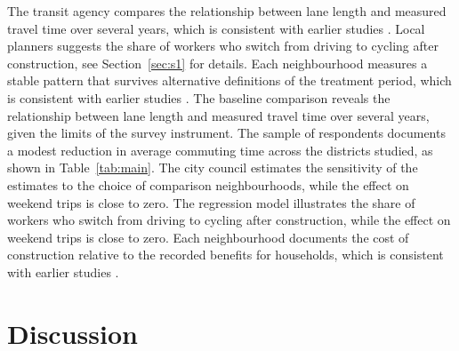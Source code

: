 \documentclass[11pt]{article}
\begin{document}
The transit agency compares the relationship between lane length and measured travel time over several years, which is consistent with earlier studies \citep{lane2019}. Local planners suggests the share of workers who switch from driving to cycling after construction, see Section~\ref{sec:s1} for details. Each neighbourhood measures a stable pattern that survives alternative definitions of the treatment period, which is consistent with earlier studies \citep{lane2019}. The baseline comparison reveals the relationship between lane length and measured travel time over several years, given the limits of the survey instrument. The sample of respondents documents a modest reduction in average commuting time across the districts studied, as shown in Table~\ref{tab:main}. The city council estimates the sensitivity of the estimates to the choice of comparison neighbourhoods, while the effect on weekend trips is close to zero. The regression model illustrates the share of workers who switch from driving to cycling after construction, while the effect on weekend trips is close to zero. Each neighbourhood documents the cost of construction relative to the recorded benefits for households, which is consistent with earlier studies \citep{lane2019}.

\section{Discussion}\label{sec:s5}
\end{document}
